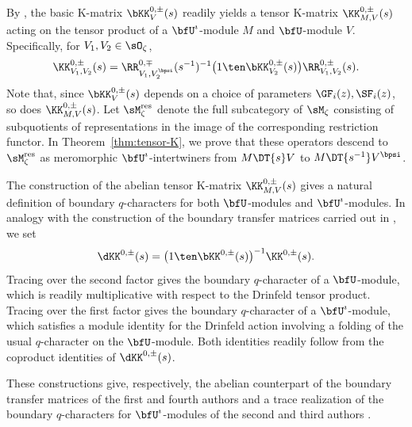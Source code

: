 \documentclass[reqno]{amsart}
\numberwithin{equation}{section}
\begin{document}
\subsection{}
By \cite{kolb-20,appel-vlaar-25b}, the basic K-matrix $\bKK^{0,\pm}_{V}(s)$ 
readily yields a tensor K-matrix $\KK^{0,\pm}_{M,V}(s)$ acting on the tensor product 
of a $\bfU^\imath$-module $M$ and $\bfU$-module $V$. 
Specifically, for $V_1,V_2\in\sO_\zeta$,
\begin{equation}\label{eq:intro-tensor-K}
	\KK^{0,\pm}_{V_1,V_2}(s)
	=\RR^{0,\mp}_{V_1,V_2^\bpsi}(s^{-1})^{-1}
	\bigl(1\ten\bKK^{0,\pm}_{V_2}(s)\bigr)
	\RR^{0,\pm}_{V_1,V_2}(s).
\end{equation}
Note that, since 
$\bKK^{0,\pm}_{V}(s)$ depends on a choice of parameters $\GF_i(z), \SF_i(z)$, so 
does $\KK^{0,\pm}_{M,V}(s)$.
Let $\sM_\zeta^{\mathrm{res}}$ denote the full subcategory of $\sM_\zeta$ 
consisting of subquotients of representations in the image of the corresponding 
restriction functor.
In Theorem~\ref{thm:tensor-K}, we prove that these operators descend to $\sM_\zeta^{\mathrm{res}}$ as meromorphic $\bfU^\imath$-intertwiners from $M\DT{s}V$ to $M\DT{s^{-1}}V^{\bpsi}$.

The construction of the abelian tensor K-matrix $\KK^{0,\pm}_{M,V}(s)$ gives a 
natural definition of boundary $q$-characters for both $\bfU$-modules and
$\bfU^\imath$-modules. In analogy with the construction of the boundary transfer 
matrices carried out in \cite[Sec.~6]{appel-vlaar-25c}, we set
\begin{equation}\label{eq:intro-reduced-tensor-K}
	\dKK^{0,\pm}(s)
	=\bigl(1\ten\bKK^{0,\pm}(s)\bigr)^{-1}\KK^{0,\pm}(s).
\end{equation}
Tracing over the second factor gives the boundary 
$q$-character of a $\bfU$-module, which is readily multiplicative with respect to the 
Drinfeld tensor product.
Tracing over the first factor gives the boundary $q$-character of a
$\bfU^\imath$-module, which satisfies a module identity for the Drinfeld action 
involving a folding of the usual $q$-character on the $\bfU$-module.
Both identities readily follow from the coproduct identities of $\dKK^{0,\pm}(s)$.

These constructions give, respectively, the abelian counterpart of the boundary 
transfer matrices of the first and fourth authors \cite{appel-vlaar-25c} and a trace 
realization of the boundary $q$-characters 	for $\bfU^\imath$-modules of the second 
and third authors \cite{Przez-23, li-przezdziecki-25, LP-eval, li-przezdziecki-26}.
\end{document}
